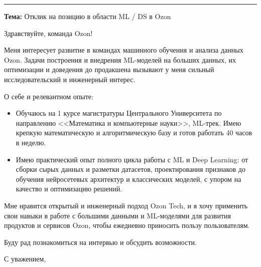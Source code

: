 \documentclass[letterpaper,11pt]{article}
\begin{document}

\vspace{0.5cm}
\hrule
\vspace{0.5cm}

\textbf{Тема:} Отклик на позицию в области ML / DS в Ozon

Здравствуйте, команда Ozon!

Меня интересует развитие в командах машинного обучения и анализа данных Ozon. Задачи построения и внедрения ML-моделей на больших данных, их оптимизации и доведения до продакшена вызывают у меня сильный исследовательский и инженерный интерес.

О себе и релевантном опыте:
\begin{itemize}[leftmargin=0.2in, itemsep=2pt, topsep=0pt]
	\item Обучаюсь на 1 курсе магистратуры Центрального Университета по направлению <<Математика и компьютерные науки>>, ML-трек. Имею крепкую математическую и алгоритмическую базу и готов работать 40 часов в неделю.
	\item Имею практический опыт полного цикла работы с ML и Deep Learning: от сборки сырых данных и разметки датасетов, проектирования признаков до обучения нейросетевых архитектур и классических моделей, с упором на качество и оптимизацию решений.
\end{itemize}

Мне нравится открытый и инженерный подход Ozon Tech, и я хочу применить свои навыки в работе с большими данными и ML-моделями для развития продуктов и сервисов Ozon, чтобы ежедневно приносить пользу пользователям.

Буду рад познакомиться на интервью и обсудить возможности.

С уважением,\\
\fullName
\end{document}
